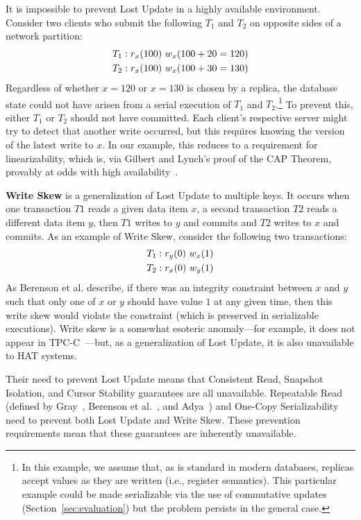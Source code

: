 It is impossible to prevent Lost Update in a highly available
environment. Consider two clients who submit the following $T_1$ and
$T_2$ on opposite sides of a network partition:
\begin{align*}
\small\vspace{-1em}
T_1 &: r_x(100)~w_x(100+20=120)
\\T_2 &: r_x(100)~w_x(100+30=130)\vspace{-1em}
\end{align*}
Regardless of whether $x=120$ or $x=130$ is chosen by a replica, the
database state could not have arisen from a serial execution of $T_1$ and
$T_2$.\footnote{In this example, we assume that, as is standard in
  modern databases, replicas accept values as they are written (i.e.,
  register semantics). This particular example could be made
  serializable via the use of commutative updates
  (Section~\ref{sec:evaluation}) but the problem persists in the
  general case.}  To prevent this, either $T_1$ or
$T_2$ should not have committed. Each client's respective server might
try to detect that another write occurred, but this requires knowing
the version of the latest write to $x$. In our example, this reduces
to a requirement for linearizability, which is, via Gilbert and
Lynch's proof of the CAP Theorem, provably at odds with high
availability~\cite{gilbert-cap}.

\textbf{Write Skew} is a generalization of Lost Update to multiple
keys. It occurs when one transaction $T1$ reads a given data item $x$,
a second transaction $T2$ reads a different data item $y$, then $T1$
writes to $y$ and commits and $T2$ writes to $x$ and commits. As an
example of Write Skew, consider the following two transactions:
\begin{align*}
\small
T_1 &: r_y(0)~w_x(1)
\\T_2 &: r_x(0)~w_y(1)
\end{align*}
As Berenson et al. describe, if there was an integrity constraint
between $x$ and $y$ such that only one of $x$ or $y$ should have value
$1$ at any given time, then this write skew would violate the constraint (which is preserved in serializable executions). Write skew is a somewhat
esoteric anomaly---for example, it does not appear in
TPC-C~\cite{snapshot-serializable}---but, as a generalization of Lost
Update, it is also unavailable to HAT systems.

Their need to prevent Lost Update means that Consistent Read, Snapshot
Isolation, and Cursor Stability guarantees are all unavailable.
Repeatable Read (defined by Gray~\cite{gray-isolation}, Berenson et
al.~\cite{ansicritique}, and Adya~\cite{adya}) and One-Copy
Serializability need to prevent both Lost Update and Write Skew. These
prevention requirements mean that these guarantees are inherently
unavailable.


